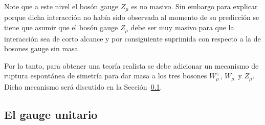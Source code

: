 Note que a este nivel el bosón gauge $Z_{\mu}$ es no masivo. Sin embargo para explicar porque dicha interacción no había sido observada al momento de su predicción se tiene que asumir que el bosón gauge $Z_{\mu}$ debe ser muy masivo para que la interacción sea de corto alcance y por consiguiente suprimida con respecto a la de bosones gauge sin masa. 

Por lo tanto, para obtener una teoría realista se debe adicionar un mecanismo de ruptura espontánea de simetría para dar masa a los tres bosones $W_{\mu}^{+}$, $W_{\mu}^{-}$ y $Z_{\mu}$. Dicho mecanismo será discutido en la Sección~\ref{sec:el-gauge-unitario}.



\subsection{El gauge unitario}
\label{sec:el-gauge-unitario}

